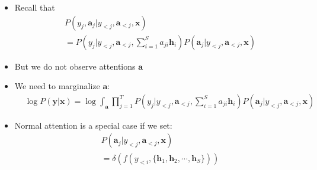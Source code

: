 \begin{frame}{\subsecname}
    \begin{itemize}
        \item Recall that 
       \begin{align*}
    &P(y_j, \mathbf{a}_j| y_{<j}, \mathbf{a}_{<j},\mathbf{x}) \\
   &= P(y_j | y_{<j}, \mathbf{a}_{<j},\sum_{i=1}^S a_{ji} \mathbf{h}_i)P(\mathbf{a}_j | y_{<j}, \mathbf{a}_{<j},\mathbf{x}  )
    \end{align*}
    \item<2-> But we do not observe attentions $\mathbf{a}$
    \item<3-> We need to marginalize $\mathbf{a}$:
    \begin{align*}
    &\log P(\mathbf{y}|\mathbf{x}) = \log \int_{\mathbf{a}}\prod_{j=1}^T P(y_j | y_{<j}, \mathbf{a}_{<j},\sum_{i=1}^S a_{ji} \mathbf{h}_i)P(\mathbf{a}_j | y_{<j}, \mathbf{a}_{<j},\mathbf{x}  )
\end{align*}
    \item<4-> Normal attention is a special case if we set:
    \begin{align*}
        &P(\mathbf{a}_j | y_{<j}, \mathbf{a}_{<j},\mathbf{x})\\
        &=\delta(f(y_{<i}, \{\mathbf{h}_1, \mathbf{h}_2, \cdots, \mathbf{h}_S\}))
    \end{align*}
    \end{itemize}
   
\end{frame}

